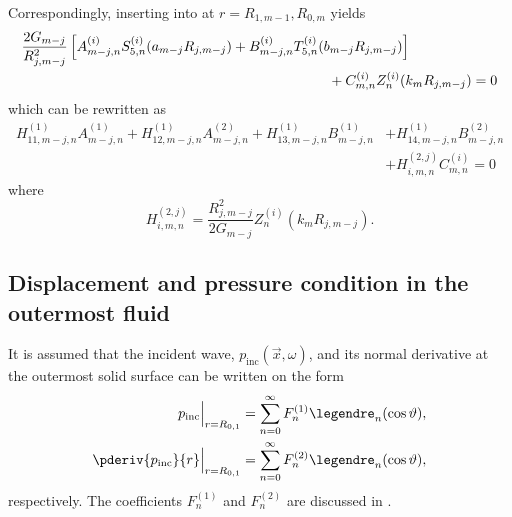 Correspondingly, inserting  into  at $r=R_{1,m-1},R_{0,m}$ yields
\begin{align*}
	&\frac{2G_{m-j}}{R_{j,m-j}^2}\left[A_{m-j,n}^{(i)} S_{5,n}^{(i)}(a_{m-j} R_{j,m-j}) + B_{m-j,n}^{(i)} T_{5,n}^{(i)}(b_{m-j} R_{j,m-j})\right] \\
	&{\hskip22em\relax}+ C_{m,n}^{(i)} Z_n^{(i)}(k_m R_{j,m-j}) = 0
\end{align*}
which can be rewritten as
\begin{align}
	H_{11,m-j,n}^{(1)}A_{m-j,n}^{(1)} + H_{12,m-j,n}^{(1)}A_{m-j,n}^{(2)} + H_{13,m-j,n}^{(1)}B_{m-j,n}^{(1)} &+ H_{14,m-j,n}^{(1)}B_{m-j,n}^{(2)}\nonumber\\
	&+ H_{i,m,n}^{(2,j)}C_{m,n}^{(i)} = 0
\end{align}
where
\begin{equation}\label{Eq1:K2}
	H_{i,m,n}^{(2,j)} = \frac{R_{j,m-j}^2}{2G_{m-j}}Z_n^{(i)}(k_mR_{j,m-j}).
\end{equation}


\subsection{Displacement and pressure condition in the outermost fluid}
It is assumed that the incident wave, $p_{\mathrm{inc}}(\vec{x},\omega)$, and its normal derivative at the outermost solid surface can be written on the form
\begin{align}\label{Eq1:IncidentWaveConds}
\begin{split}
	p_{\mathrm{inc}}\Big\vert_{r=R_{0,1}} &= \sum_{n=0}^\infty F_n^{(1)} \legendre_n(\cos\vartheta),\\
	\pderiv{p_{\mathrm{inc}}}{r}\Big\vert_{r=R_{0,1}} &= \sum_{n=0}^\infty F_n^{(2)} \legendre_n(\cos\vartheta),
	\end{split}
\end{align}
respectively. The coefficients $F_n^{(1)}$ and $F_n^{(2)}$ are discussed in .

